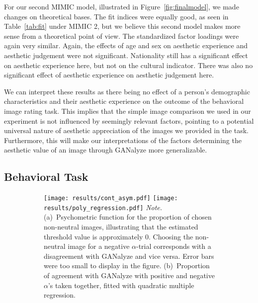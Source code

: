 \documentclass[../main.tex]{subfiles}
\begin{document}
For our second MIMIC model, illustrated in Figure~\ref{fig:finalmodel}, we made changes on theoretical bases. The fit indices were equally good, as seen in Table~\ref{tab:fit} under MIMIC 2, but we believe this second model makes more sense from a theoretical point of view. The standardized factor loadings were again very similar. Again, the effects of age and sex on aesthetic experience and aesthetic judgement were not significant. Nationality still has a significant effect on aesthetic experience here, but not on the cultural indicator. There was also no significant effect of aesthetic experience on aesthetic judgement here.



We can interpret these results as there being no effect of a person's demographic characteristics and their aesthetic experience on the outcome of the behavioral image rating task. This implies that the simple image comparison we used in our experiment is not influenced by seemingly relevant factors, pointing to a potential universal nature of aesthetic appreciation of the images we provided in the task. Furthermore, this will make our interpretations of the factors determining the aesthetic value of an image through GANalyze more generalizable.



\subsection{Behavioral Task}

\begin{figure}[!h]
	\caption{Behavioral Results from the Image Rating Task}
	\label{fig:psychometric_curves}
	\centering
	\begin{subfigure}{\textwidth}
		{\centering
			\texttt{[image: results/cont\_asym.pdf]}
			\hfill
			\texttt{[image: results/poly\_regression.pdf]}} \newline
		{\textit{Note.} (a)~Psychometric function for the proportion of chosen non-neutral images, illustrating that the estimated threshold value is approximately 0. Choosing the non-neutral image for a negative $\alpha$-trial corresponds with a disagreement with GANalyze and vice versa. Error bars were too small to display in the figure. (b)~Proportion of agreement with GANalyze with positive and negative $\alpha$'s taken together, fitted with quadratic multiple regression.}
	\end{subfigure}
\end{figure}
\end{document}
